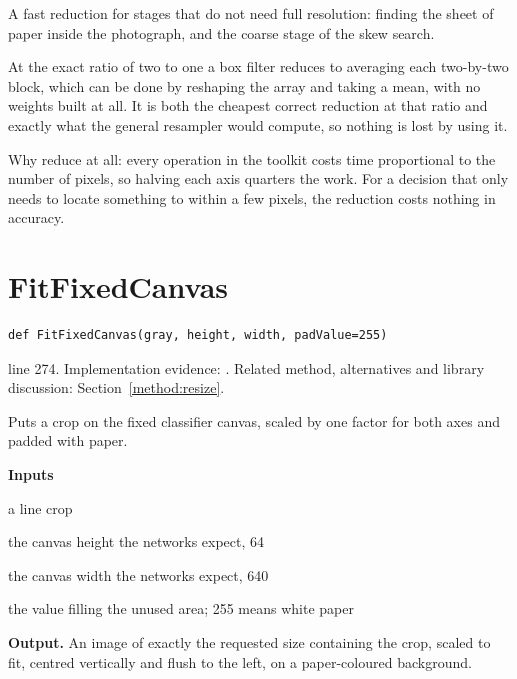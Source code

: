 A fast reduction for stages that do not need full resolution: finding the sheet of paper inside the photograph, and the coarse stage of the skew search.


At the exact ratio of two to one a box filter reduces to averaging each two-by-two block, which can be done by reshaping the array and taking a mean, with no weights built at all. It is both the cheapest correct reduction at that ratio and exactly what the general resampler would compute, so nothing is lost by using it.

Why reduce at all: every operation in the toolkit costs time proportional to the number of pixels, so halving each axis quarters the work. For a decision that only needs to locate something to within a few pixels, the reduction costs nothing in accuracy.



\section{FitFixedCanvas}\label{fn:segment:FitFixedCanvas}
\begin{lstlisting}[style=sig]
def FitFixedCanvas(gray, height, width, padValue=255)
\end{lstlisting}
 line 274. Implementation evidence: \cite{code2026}. Related method, alternatives and library discussion: Section~\ref{method:resize}.


Puts a crop on the fixed classifier canvas, scaled by one factor for both axes and padded with paper.




\noindent\textbf{Inputs}
\begin{description}[leftmargin=2.2em,style=nextline,font=\normalfont\ttfamily]\setlength\itemsep{1pt}
  \item[{gray}] \normalfont a line crop
  \item[{height}] \normalfont the canvas height the networks expect, 64
  \item[{width}] \normalfont the canvas width the networks expect, 640
  \item[{padValue}] \normalfont the value filling the unused area; 255 means white paper
\end{description}

\noindent\textbf{Output.} An image of exactly the requested size containing the crop, scaled to fit, centred vertically and flush to the left, on a paper-coloured background.


